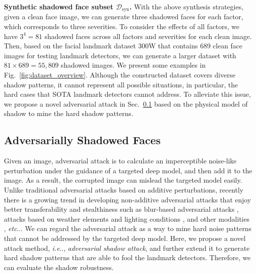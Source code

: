 \documentclass[10pt,twocolumn,letterpaper]{article}
\makeatletter
\newcommand{\figref}[1]{Fig.~\ref{#1}}
\newcommand{\secref}[1]{Sec.~\ref{#1}}
\DeclareRobustCommand\onedot{\futurelet\@let@token\@onedot}
\def\@onedot{\ifx\@let@token.\else.\null\fi\xspace}
\def\ie{\emph{i.e}\onedot} \def\Ie{\emph{I.e}\onedot}
\def\etc{\emph{etc}\onedot} \def\vs{\emph{vs}\onedot}
\renewcommand{\paragraph}[1]{\vspace{1.25mm}\noindent\textbf{#1}}
\makeatother
\begin{document}
%
\paragraph{Synthetic shadowed face subset $\mathcal{D}_\text{syn}$.} With the above synthesis strategies,  given a clean face image, we can generate three shadowed faces for each factor, which corresponds to three severities. To consider the effects of all factors, we have $3^4=81$ shadowed faces across all factors and severities for each clean image.
%
Then, based on the facial landmark dataset 300W \cite{sagonas2013300} that contains 689 clean face images for testing landmark detectors, we can generate a larger dataset with $81\times 689=55,809$ shadowed images. We present some examples in \figref{fig:dataset_overview}. 
%
Although the constructed dataset covers diverse shadow patterns, it cannot represent all possible situations, in particular, the hard cases that SOTA landmark detectors cannot address. 
%
To alleviate this issue, we propose a novel adversarial attack in \secref{subsec:adv} based on the physical model of shadow to mine the hard shadow patterns.

\subsection{Adversarially Shadowed Faces}\label{subsec:adv}
%
Given an image, adversarial attack is to calculate an imperceptible noise-like perturbation under the guidance of a targeted deep model, and then add it to the image. As a result, the corrupted image can mislead the targeted model easily.
%
Unlike traditional adversarial attacks based on additive perturbations, recently there is a growing trend in developing non-additive adversarial attacks that enjoy better transferability and stealthiness such as blur-based adversarial attacks \cite{neurips20_abba,iccv21_advmot,arxiv21_advbokeh}, attacks based on weather elements \cite{zhai2020s,arxiv21_advhaze} and lighting conditions \cite{arxiv21_ara,ijcai21_ava,icme21_xray,cheng2020adversarial}, and other modalities \cite{gao2020making,tmm21_pasadena,acmmm20_amora,eccv20_spark,iccv21_flat}, \etc. 
%
We can regard the adversarial attack as a way to mine hard noise patterns that cannot be addressed by the targeted deep model.
%
Here, we propose a novel attack method, \ie, \textit{adversarial shadow attack}, and further extend it to generate hard shadow patterns that are able to fool the landmark detectors. 
%
Therefore, we can evaluate the shadow robustness.
\end{document}
